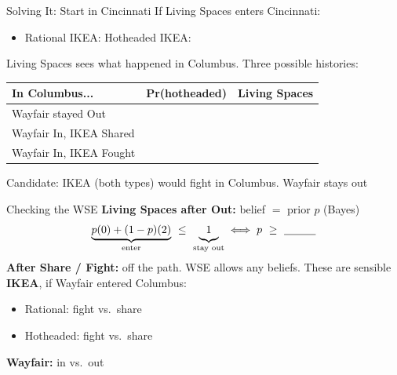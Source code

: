 \begin{frame}{Solving It: Start in Cincinnati}
If Living Spaces enters Cincinnati:
\begin{itemize}
    \item Rational IKEA: \underline{\hspace{0.6in}} \qquad Hotheaded IKEA: \underline{\hspace{0.6in}}
\end{itemize}
\bsk
Living Spaces sees what happened in Columbus. Three possible histories:
\bsk
\centering
\renewcommand{\arraystretch}{1.6}
\begin{tabular}{|l|c|c|}
\hline
In Columbus... & Pr(hotheaded) & Living Spaces \\
\hline
Wayfair stayed Out & \hspace{0.8in} & \hspace{0.8in} \\
Wayfair In, IKEA Shared & & \\
Wayfair In, IKEA Fought & & \\
\hline
\end{tabular}
\bsk
\raggedright
Candidate: IKEA (both types) would fight in Columbus. Wayfair stays out
\vspace{-0.3in}
\end{frame}

\begin{frame}{Checking the WSE}
\textbf{Living Spaces after Out:} belief $=$ prior $p$ (Bayes)
$$\underbrace{p(0)+(1-p)(2)}_{\text{enter}}\ \le\ \underbrace{1\vphantom{()}}_{\text{stay out}} \iff p\ \ge\ \underline{\hspace{0.4in}}$$
\textbf{After Share / Fight:} off the path. WSE allows any beliefs. These are sensible
\bsk
\textbf{IKEA}, if Wayfair entered Columbus:
\begin{itemize}
    \item Rational: fight \underline{\hspace{0.6in}} vs.\ share \underline{\hspace{0.6in}}
    \item Hotheaded: fight \underline{\hspace{0.6in}} vs.\ share \underline{\hspace{0.6in}}
\end{itemize}
\textbf{Wayfair:} in \underline{\hspace{0.3in}} vs.\ out \underline{\hspace{0.3in}}
\vspace{-0.3in}
\end{frame}

